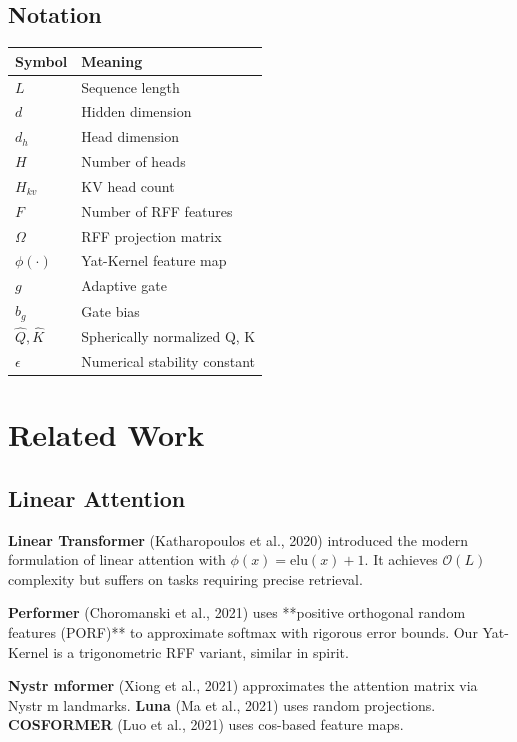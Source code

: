 \subsection{Notation}

\begin{table}[H]
\centering
\small
\begin{tabular}{ll}
\toprule
\textbf{Symbol} & \textbf{Meaning} \\
\midrule
$L$ & Sequence length \\
$d$ & Hidden dimension \\
$d_h$ & Head dimension \\
$H$ & Number of heads \\
$H_{kv}$ & KV head count \\
$F$ & Number of RFF features \\
$\Omega$ & RFF projection matrix \\
$\phi(\cdot)$ & Yat-Kernel feature map \\
$g$ & Adaptive gate \\
$b_g$ & Gate bias \\
$\hat{Q}, \hat{K}$ & Spherically normalized Q, K \\
$\epsilon$ & Numerical stability constant \\
\bottomrule
\end{tabular}
\end{table}



\section{Related Work}

\subsection{Linear Attention}

\textbf{Linear Transformer} (Katharopoulos et al., 2020) introduced the modern 
formulation of linear attention with $\phi(x) = \text{elu}(x) + 1$. It 
achieves $\mathcal{O}(L)$ complexity but suffers on tasks requiring precise 
retrieval.

\textbf{Performer} (Choromanski et al., 2021) uses **positive orthogonal random 
features (PORF)** to approximate softmax with rigorous error bounds. Our 
Yat-Kernel is a trigonometric RFF variant, similar in spirit.

\textbf{Nystr mformer} (Xiong et al., 2021) approximates the attention matrix 
via Nystr m landmarks. \textbf{Luna} (Ma et al., 2021) uses random projections. 
\textbf{COSFORMER} (Luo et al., 2021) uses cos-based feature maps.

